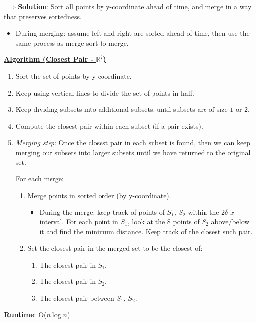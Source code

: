 \documentclass[12pt]{extarticle}
\theoremstyle{definition}
\theoremstyle{remark}
\newcommand{\probtitle}[1]{\noindent \textbf{\ul{#1}}}
\begin{document}
\vspace{8pt}
\noindent $\implies$\textbf{Solution}: Sort all points by y-coordinate ahead of time, and merge in a way that preserves sortedness. \begin{itemize}
    \item During merging: assume left and right are sorted ahead of time, then use the same process as merge sort to merge.
\end{itemize}

\begin{tcolorbox}[colback=blue!50!red!7!white]
    \probtitle{Algorithm (Closest Pair - $\mathbb{R}^2$)}
    \begin{enumerate}
        \item Sort the set of points by y-coordinate.
        \item Keep using vertical lines to divide the set of points in half. 
        \item Keep dividing subsets into additional subsets, until subsets are of size $1$ or $2$. 
        \item Compute the closest pair within each subset (if a pair exists).
        \item \textit{Merging step}: Once the closest pair in each subset is found, then we can keep merging our subsets into larger subsets until we have returned to the original set.

        For each merge:
        \begin{enumerate}
            \item Merge points in sorted order (by y-coordinate). \begin{itemize}
                \item During the merge: keep track of points of $S_1$, $S_2$ within the $2\delta$ $x$-interval. For each point in $S_1$, look at the 8 points of $S_2$ above/below it and find the minimum distance. Keep track of the closest such pair.
            \end{itemize}
            \item Set the closest pair in the merged set to be the closest of: \begin{enumerate}
                \item The closest pair in $S_1$.
                \item The closest pair in $S_2$.
                \item The closest pair between $S_1$, $S_2$.
            \end{enumerate}
        \end{enumerate}
    \end{enumerate}
    \vspace{5pt}
    \noindent\textbf{Runtime}: O($n\log n$)
\end{tcolorbox}
\end{document}
